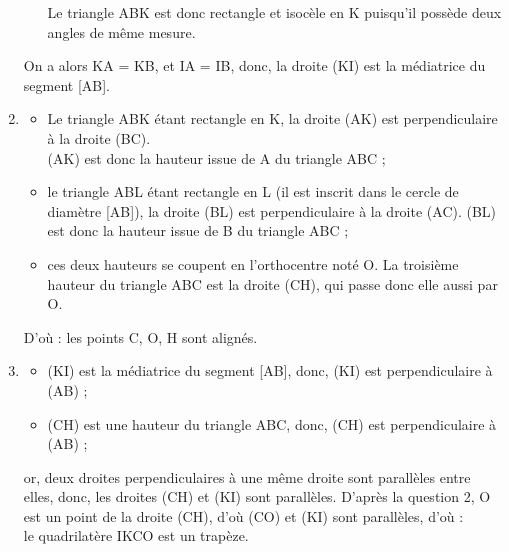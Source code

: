 \begin{corrige}
\begin{enumerate}
\begin{itemize}
                  Le triangle ABK est donc rectangle et isocèle en K puisqu'il possède deux angles de même mesure.
            \end{itemize}
            On a alors KA = KB, et IA = IB, donc, {\blue la droite (KI) est la médiatrice du segment [AB].}
         \item
            \begin{itemize}
                \item Le triangle ABK étant rectangle en K, la droite (AK) est perpendiculaire à la droite (BC). \\
                   (AK) est donc la hauteur issue de A du triangle ABC ;
                \item le triangle ABL étant rectangle en L (il est inscrit dans le cercle de diamètre [AB]), la droite (BL) est perpendiculaire à la droite (AC). (BL) est donc la hauteur issue de B du triangle ABC ;
                \item ces deux hauteurs se coupent en l'orthocentre noté O. La troisième hauteur du triangle ABC est la droite (CH), qui passe donc elle aussi par O.
            \end{itemize}     
            D'où : {\blue les points C, O, H sont alignés.}
         \item 
            \begin{itemize}
               \item (KI) est la médiatrice du segment [AB], donc, (KI) est perpendiculaire à (AB) ;
               \item (CH) est une hauteur du triangle ABC, donc, (CH) est perpendiculaire à (AB) ;
            \end{itemize}
            or, deux droites perpendiculaires à une même droite sont parallèles entre elles, donc, les droites (CH) et (KI) sont parallèles. D'après la question 2, O est un point de la droite (CH), d'où  (CO) et (KI) sont parallèles, d'où : \\
            {\blue le quadrilatère IKCO est un trapèze.}
   \end{enumerate}
\end{corrige}


\bigskip


